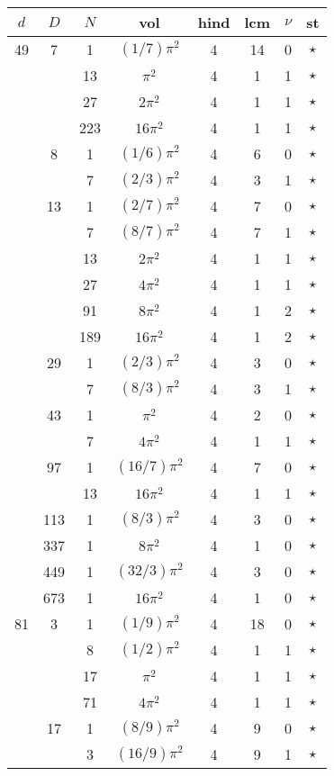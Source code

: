 \documentclass[12pt]{amsart}
\begin{document}
\begin{tabular}{ccc|ccccc}
$d$ & $D$ & $N$ & vol & hind & lcm & $\nu$ & st\\
\hline
49 & 7 & 1 & $(1/7)\pi^2$ & 4 & 14 & 0 & $\star$ \\
 &  & 13 & $\pi^2$ & 4 & 1 & 1 & $\star$ \\
 &  & 27 & $2\pi^2$ & 4 & 1 & 1 & $\star$ \\
 &  & 223 & $16\pi^2$ & 4 & 1 & 1 & $\star$ \\
 & 8 & 1 & $(1/6)\pi^2$ & 4 & 6 & 0 & $\star$ \\
 &  & 7 & $(2/3)\pi^2$ & 4 & 3 & 1 & $\star$ \\
 & 13 & 1 & $(2/7)\pi^2$ & 4 & 7 & 0 & $\star$ \\
 &  & 7 & $(8/7)\pi^2$ & 4 & 7 & 1 & $\star$ \\
 &  & 13 & $2\pi^2$ & 4 & 1 & 1 & $\star$ \\
 &  & 27 & $4\pi^2$ & 4 & 1 & 1 & $\star$ \\
 &  & 91 & $8\pi^2$ & 4 & 1 & 2 & $\star$ \\
 &  & 189 & $16\pi^2$ & 4 & 1 & 2 & $\star$ \\
 & 29 & 1 & $(2/3)\pi^2$ & 4 & 3 & 0 & $\star$ \\
 &  & 7 & $(8/3)\pi^2$ & 4 & 3 & 1 & $\star$ \\
 & 43 & 1 & $\pi^2$ & 4 & 2 & 0 & $\star$ \\
 &  & 7 & $4\pi^2$ & 4 & 1 & 1 & $\star$ \\
 & 97 & 1 & $(16/7)\pi^2$ & 4 & 7 & 0 & $\star$ \\
 &  & 13 & $16\pi^2$ & 4 & 1 & 1 & $\star$ \\
 & 113 & 1 & $(8/3)\pi^2$ & 4 & 3 & 0 & $\star$ \\
 & 337 & 1 & $8\pi^2$ & 4 & 1 & 0 & $\star$ \\
 & 449 & 1 & $(32/3)\pi^2$ & 4 & 3 & 0 & $\star$ \\
 & 673 & 1 & $16\pi^2$ & 4 & 1 & 0 & $\star$ \\
81 & 3 & 1 & $(1/9)\pi^2$ & 4 & 18 & 0 & $\star$ \\
 &  & 8 & $(1/2)\pi^2$ & 4 & 1 & 1 & $\star$ \\
 &  & 17 & $\pi^2$ & 4 & 1 & 1 & $\star$ \\
 &  & 71 & $4\pi^2$ & 4 & 1 & 1 & $\star$ \\
 & 17 & 1 & $(8/9)\pi^2$ & 4 & 9 & 0 & $\star$ \\
 &  & 3 & $(16/9)\pi^2$ & 4 & 9 & 1 & $\star$ \\

\end{tabular}
\end{document}
